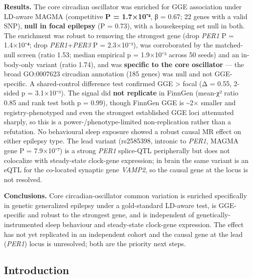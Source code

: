 \documentclass[
]{article}
\begin{document}
\textbf{Results.} The core circadian oscillator was enriched for GGE
association under LD-aware MAGMA (competitive \textbf{P = 1.7×10⁻⁴}, β =
0.67; 22 genes with a valid SNP), \textbf{null in focal epilepsy} (P =
0.73), with a housekeeping set null in both. The enrichment was robust
to removing the strongest gene (drop \emph{PER1} P = 1.4×10⁻⁴; drop
\emph{PER1}+\emph{PER3} P = 2.3×10⁻³), was corroborated by the
matched-null screen (ratio 1.53; median empirical p = 1.9×10⁻³ across 50
seeds) and an in-body-only variant (ratio 1.74), and was
\textbf{specific to the core oscillator} --- the broad GO:0007623
circadian annotation (185 genes) was null and not GGE-specific. A
shared-control difference test confirmed GGE \textgreater{} focal (Δ =
0.55, 2-sided p = 3.1×10⁻³). The signal did \textbf{not replicate} in
FinnGen (mean-χ² ratio 0.85 and rank test both p = 0.99), though FinnGen
GGE is \textasciitilde2× smaller and registry-phenotyped and even the
strongest established GGE loci attenuated sharply, so this is a
power-/phenotype-limited non-replication rather than a refutation. No
behavioural sleep exposure showed a robust causal MR effect on either
epilepsy type. The lead variant (rs2585398, intronic to \emph{PER1},
MAGMA gene P = 7.9×10⁻⁷) is a strong \emph{PER1} splice-QTL peripherally
but does not colocalize with steady-state clock-gene expression; in
brain the same variant is an eQTL for the co-located synaptic gene
\emph{VAMP2}, so the causal gene at the locus is not resolved.

\textbf{Conclusions.} Core circadian-oscillator common variation is
enriched specifically in genetic generalized epilepsy under a
gold-standard LD-aware test, is GGE-specific and robust to the strongest
gene, and is independent of genetically-instrumented sleep behaviour and
steady-state clock-gene expression. The effect has not yet replicated in
an independent cohort and the causal gene at the lead (\emph{PER1})
locus is unresolved; both are the priority next steps.

\subsection{Introduction}\label{introduction}
\end{document}
